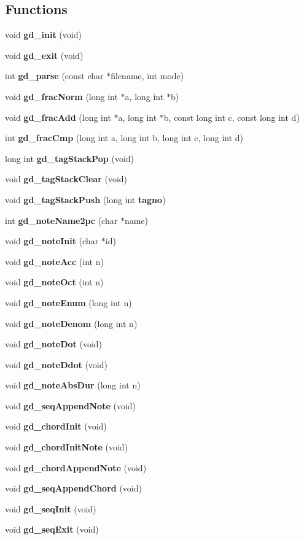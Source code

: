 \subsection*{Functions}
\begin{CompactItemize}
\item 
void {\bf gd\_\-init} (void)
\item 
void {\bf gd\_\-exit} (void)
\item 
int {\bf gd\_\-parse} (const char $\ast$filename, int mode)
\item 
void {\bf gd\_\-frac\-Norm} (long int $\ast$a, long int $\ast$b)
\item 
void {\bf gd\_\-frac\-Add} (long int $\ast$a, long int $\ast$b, const long int c, const long int d)
\item 
int {\bf gd\_\-frac\-Cmp} (long int a, long int b, long int c, long int d)
\item 
long int {\bf gd\_\-tag\-Stack\-Pop} (void)
\item 
void {\bf gd\_\-tag\-Stack\-Clear} (void)
\item 
void {\bf gd\_\-tag\-Stack\-Push} (long int {\bf tagno})
\item 
int {\bf gd\_\-note\-Name2pc} (char $\ast$name)
\item 
void {\bf gd\_\-note\-Init} (char $\ast$id)
\item 
void {\bf gd\_\-note\-Acc} (int n)
\item 
void {\bf gd\_\-note\-Oct} (int n)
\item 
void {\bf gd\_\-note\-Enum} (long int n)
\item 
void {\bf gd\_\-note\-Denom} (long int n)
\item 
void {\bf gd\_\-note\-Dot} (void)
\item 
void {\bf gd\_\-note\-Ddot} (void)
\item 
void {\bf gd\_\-note\-Abs\-Dur} (long int n)
\item 
void {\bf gd\_\-seq\-Append\-Note} (void)
\item 
void {\bf gd\_\-chord\-Init} (void)
\item 
void {\bf gd\_\-chord\-Init\-Note} (void)
\item 
void {\bf gd\_\-chord\-Append\-Note} (void)
\item 
void {\bf gd\_\-seq\-Append\-Chord} (void)
\item 
void {\bf gd\_\-seq\-Init} (void)
\item 
void {\bf gd\_\-seq\-Exit} (void)
\item 

\end{CompactItemize}
